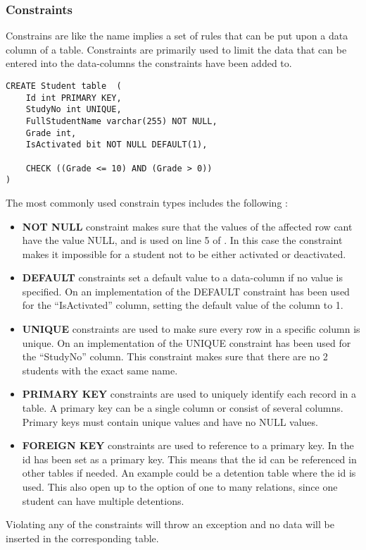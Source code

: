 \subsubsection{Constraints}
Constrains are like the name implies a set of rules that can be put upon a data column of a table. Constraints are primarily used to limit the data that can be entered into the data-columns the constraints have been added to.

\begin{lstlisting}[style=SQLstyle, numberblanklines=false, label=lst:example_of_using_constraints, caption={Example of using constraints}]
CREATE Student table  (
	Id int PRIMARY KEY,
	StudyNo int UNIQUE,
	FullStudentName varchar(255) NOT NULL,
	Grade int,
	IsActivated bit NOT NULL DEFAULT(1),
	
	CHECK ((Grade <= 10) AND (Grade > 0))
)
\end{lstlisting}

\noindent
The most commonly used constrain types includes the following \cite{SQLConstraint}:

\begin{itemize}
\item \textbf{NOT NULL} constraint makes sure that the values of the affected row cant have the value NULL, and is used on line 5 of . In this case the constraint makes it impossible for a student not to be either activated or deactivated. 

\item \textbf{DEFAULT} constraints set a default value to a data-column if no value is specified. On  an implementation of the DEFAULT constraint has been used for the \enquote{IsActivated} column, setting the default value of the column to 1. 

\item \textbf{UNIQUE} constraints are used to make sure every row in a specific column is unique. On  an implementation of the UNIQUE constraint has been used for the \enquote{StudyNo} column. This constraint makes sure that there are no 2 students with the exact same name. 

\item \textbf{PRIMARY KEY} constraints are used to uniquely identify each record in a table. A primary key can be a single column or consist of several columns. Primary keys must contain unique values and have no NULL values.

\item \textbf{FOREIGN KEY} constraints are used to reference to a primary key. In  the id has been set as a primary key. This means that the id can be referenced in other tables if needed. An example could be a detention table where the id is used. This also open up to the option of one to many relations, since one student can have multiple detentions.
\end{itemize}

\noindent
Violating any of the constraints will throw an exception and no data will be inserted in the corresponding table.





